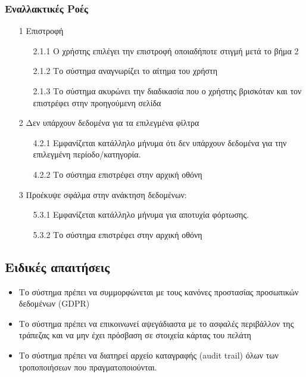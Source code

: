 \documentclass[12pt,a4paper,twoside]{book}
\begin{document}
\subsubsection{Εναλλακτικές Ροές}
\begin{enumerate}
  \item[1 ] Επιστροφή
        \begin{enumerate}
          \item[2.1.1 ] Ο χρήστης επιλέγει την επιστροφή οποιαδήποτε στιγμή μετά το βήμα 2 %
          \item[2.1.2 ] Το σύστημα αναγνωρίζει το αίτημα του χρήστη %
          \item[2.1.3 ] Το σύστημα ακυρώνει την διαδικασία που ο χρήστης βρισκόταν και τον επιστρέφει στην προηγούμενη σελίδα %
        \end{enumerate}
  \item[2 ] Δεν υπάρχουν δεδομένα για τα επιλεγμένα φίλτρα %
        \begin{enumerate}
          \item[4.2.1 ] Εμφανίζεται κατάλληλο μήνυμα ότι δεν υπάρχουν δεδομένα για την επιλεγμένη περίοδο/κατηγορία. %
          \item[4.2.2 ] Το σύστημα επιστρέφει στην αρχική οθόνη  %
        \end{enumerate}
  \item[3 ] Προέκυψε σφάλμα στην ανάκτηση δεδομένων: %
        \begin{enumerate}
          \item[5.3.1 ] Εμφανίζεται κατάλληλο μήνυμα για αποτυχία φόρτωσης. %
          \item[5.3.2 ] Το σύστημα επιστρέφει στην αρχική οθόνη  %
        \end{enumerate}
\end{enumerate}

\subsection{Ειδικές απαιτήσεις} %
\begin{itemize}
  \item Το σύστημα πρέπει να συμμορφώνεται με τους κανόνες προστασίας προσωπικών δεδομένων (GDPR)  %
  \item Το σύστημα πρέπει να επικοινωνεί αψεγάδιαστα με το ασφαλές περιβάλλον της τράπεζας και να μην έχει πρόσβαση σε στοιχεία κάρτας του πελάτη   %
  \item Το σύστημα πρέπει να διατηρεί αρχείο καταγραφής (audit trail) όλων των τροποποιήσεων που πραγματοποιούνται. %
\end{itemize}
\end{document}
